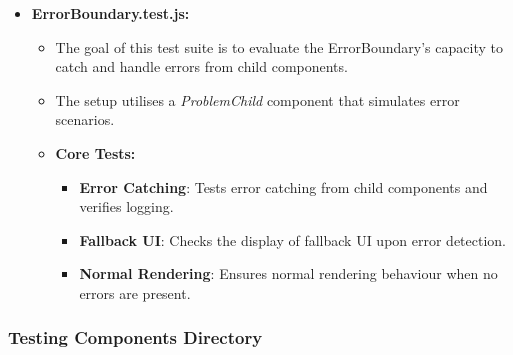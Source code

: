 \begin{itemize}
    \item \textbf{ErrorBoundary.test.js:}
    \begin{itemize}
        \item The goal of this test suite is to evaluate the ErrorBoundary's capacity to catch and handle errors from child components.
        \item The setup utilises a \textit{ProblemChild} component that simulates error scenarios.
        \item \textbf{Core Tests:}
        \begin{itemize}
            \item \textbf{Error Catching}: Tests error catching from child components and verifies logging.
            \item \textbf{Fallback UI}: Checks the display of fallback UI upon error detection.
            \item \textbf{Normal Rendering}: Ensures normal rendering behaviour when no errors are present.
        \end{itemize}
    \end{itemize}
\end{itemize}

\subsubsection{Testing Components Directory}

